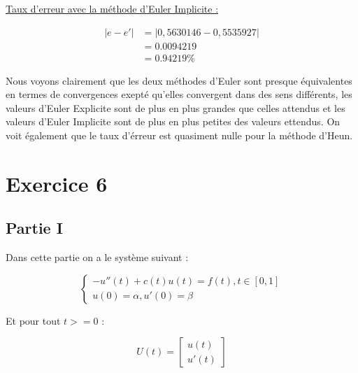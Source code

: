 \documentclass[12pt, letterpaper]{article}
\begin{document}
\begin{enumerate}
\begin{enumerate}
  \underline{Taux d'erreur avec la méthode d'Euler Implicite :}

  \begin{equation*}
    \begin{split}
      \left\lvert e - e' \right\rvert & = \left\lvert 0,5630146 - 0,5535927
        \right\rvert \\
        & = 0.0094219 \\
        & = 0.94219 \%
    \end{split}
  \end{equation*}

  Nous voyons clairement que les deux méthodes d'Euler sont presque
  équivalentes en termes de convergences exepté qu'elles convergent
  dans des sens différents, les valeurs d'Euler Explicite sont de plus
  en plus grandes que celles attendus et les valeurs d'Euler Implicite
  sont de plus en plus petites des valeurs ettendus.
  On voit également que le taux d'érreur est quasiment nulle pour la
  méthode d'Heun.
\end{enumerate}

\end{enumerate}

\section*{Exercice 6}

\subsection*{Partie I}

Dans cette partie on a le système suivant :

\begin{equation*}
  \left\{
  \begin{array}{l}
    -u''(t) + c(t)u(t) = f(t),  t \in [0,1] \\
    u(0) = \alpha, u'(0) = \beta
  \end{array}
  \right.
\end{equation*}

Et pour tout $t >= 0$ :

\begin{equation*}
  U(t) = \left[
  \begin{array}{l}
    u(t) \\
    u'(t)
  \end{array}
  \right]
\end{equation*}
\end{document}
